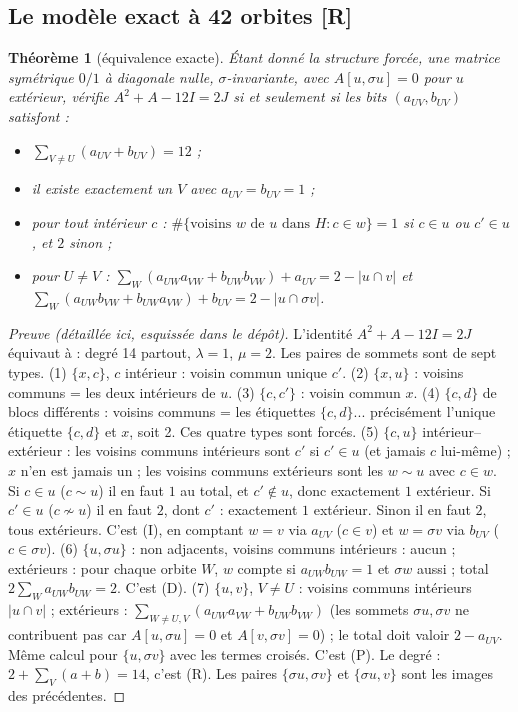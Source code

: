 \documentclass[11pt,a4paper]{article}
\newtheorem{theorem}{Théorème}[section]
\theoremstyle{definition}
\theoremstyle{remark}
\newcommand{\st}[1]{\textbf{[#1]}}
\begin{document}
\subsection{Le modèle exact à 42 orbites \st{R}}\label{sec:modele}
\begin{theorem}[équivalence exacte]\label{thm:modele}
Étant donné la structure forcée, une matrice symétrique $0/1$ à diagonale nulle, $\sigma$-invariante, avec $A[u,\sigma u]=0$ pour $u$ extérieur, vérifie $A^2+A-12I=2J$
si et seulement si les bits $(a_{UV},b_{UV})$ satisfont :
\begin{itemize}[nosep]
\item[(R)] $\sum_{V\ne U}(a_{UV}+b_{UV})=12$ ;
\item[(D)] il existe exactement un $V$ avec $a_{UV}=b_{UV}=1$ ;
\item[(I)] pour tout intérieur $c$ : $\#\{\text{voisins } w \text{ de } u \text{ dans } H : c\in w\}=1$ si $c\in u$ ou $c'\in u$, et $2$ sinon ;
\item[(P)] pour $U\ne V$ : $\sum_W(a_{UW}a_{VW}+b_{UW}b_{VW})+a_{UV}=2-|u\cap v|$ et $\sum_W(a_{UW}b_{VW}+b_{UW}a_{VW})+b_{UV}=2-|u\cap\sigma v|$.
\end{itemize}
\end{theorem}
\begin{proof}[Preuve (détaillée ici, esquissée dans le dépôt)]
L'identité $A^2+A-12I=2J$ équivaut à : degré 14 partout, $\lambda=1$, $\mu=2$. Les paires de sommets sont de sept types.
(1) $\{x,c\}$, $c$ intérieur : voisin commun unique $c'$. (2) $\{x,u\}$ : voisins communs = les deux intérieurs de $u$. (3) $\{c,c'\}$ : voisin commun $x$.
(4) $\{c,d\}$ de blocs différents : voisins communs = les étiquettes $\{c,d\}$... précisément l'unique étiquette $\{c,d\}$ et $x$, soit 2. Ces quatre types sont forcés.
(5) $\{c,u\}$ intérieur--extérieur : les voisins communs intérieurs sont $c'$ si $c'\in u$ (et jamais $c$ lui-même) ; $x$ n'en est jamais un ; les voisins communs extérieurs
sont les $w\sim u$ avec $c\in w$. Si $c\in u$ ($c\sim u$) il en faut $1$ au total, et $c'\notin u$, donc exactement $1$ extérieur. Si $c'\in u$ ($c\not\sim u$) il en faut $2$, dont $c'$ : exactement $1$ extérieur.
Sinon il en faut $2$, tous extérieurs. C'est (I), en comptant $w=v$ via $a_{UV}$ ($c\in v$) et $w=\sigma v$ via $b_{UV}$ ($c\in\sigma v$).
(6) $\{u,\sigma u\}$ : non adjacents, voisins communs intérieurs : aucun ; extérieurs : pour chaque orbite $W$, $w$ compte si $a_{UW}b_{UW}=1$ et $\sigma w$ aussi ; total $2\sum_W a_{UW}b_{UW}=2$. C'est (D).
(7) $\{u,v\}$, $V\ne U$ : voisins communs intérieurs $|u\cap v|$ ; extérieurs : $\sum_{W\ne U,V}(a_{UW}a_{VW}+b_{UW}b_{VW})$ (les sommets $\sigma u,\sigma v$ ne contribuent pas car $A[u,\sigma u]=0$ et $A[v,\sigma v]=0$) ; le total doit valoir $2-a_{UV}$. Même calcul pour $\{u,\sigma v\}$ avec les termes croisés. C'est (P).
Le degré : $2+\sum_V(a+b)=14$, c'est (R). Les paires $\{\sigma u,\sigma v\}$ et $\{\sigma u,v\}$ sont les images des précédentes.
\end{proof}
\end{document}
